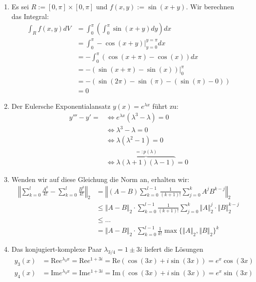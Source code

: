 \documentclass{article}
\begin{document}
\begin{enumerate}
\item Es sei $R := \left[0, \pi\right] \times \left[0, \pi\right]$ und $f(x, y)
  := \sin (x + y)$.  Wir berechnen das Integral:
  \begin{align*}
    \int_{R} f(x, y) dV
    &= \int_{0}^{\pi}\left(\int_{0}^{\pi}\sin(x+y) dy \right) dx \\
    &= \int_{0}^{\pi} - \cos (x+y)\bigg\vert_{y=0}^{y=\pi} dx \\
    &= - \int_{0}^{\pi}(\cos (x+\pi) - \cos(x)) dx \\
    &= -(\sin (x+\pi) - \sin(x)) \bigg\vert_{0}^{\pi} \\
    &= -(\sin(2\pi) - \sin(\pi) -(\sin (\pi) - 0)) \\
    &= 0
  \end{align*}
\item Der Eulersche Exponentialansatz $y(x) = e^{\lambda x}$ führt zu:
  \begin{align*}
    y''' - y' =
    &\Leftrightarrow e^{\lambda x}(\lambda^{3} - \lambda) = 0 \\
    &\Leftrightarrow \lambda^{3} - \lambda = 0 \\
    &\Leftrightarrow \lambda(\lambda^{2} - 1) = 0 \\
    &\Leftrightarrow \overbrace{\lambda(\lambda+1)(\lambda-1)}^{=: p(\lambda)} = 0
  \end{align*}
\item Wenden wir auf diese Gleichung die Norm an, erhalten wir:
  \begin{align*}
    \left\Vert \sum_{k=0}^{l}\frac{A^{k}}{k!} - \sum_{k=0}^{l}\frac{B^{k}}{k!}
    \right\Vert_{2}
    &= \left\Vert (A - B)
      \sum_{k=0}^{l-1}\frac{1}{(k+1)!}\sum_{j=0}^{k}A^{j}B^{k-j}\right\Vert_{2}
    \\
    &\le \left\Vert A - B \right\Vert_{2} \cdot \sum_{k=0}^{l-1} \frac{1}{(k+1)!}
    \sum_{j=0}^{k}\left\Vert A \right\Vert_{2}^{j} \cdot \left\Vert B \right\Vert_{2}^{k-j}
    \\
    &\le \ldots \\
    &= \left\Vert A - B \right\Vert_{2} \cdot \sum_{k=0}^{l-1}\frac{1}{k!}
      \max\{\left\Vert A \right\Vert_{2}, \left\Vert B \right\Vert_{2}\}^{k}
  \end{align*}
\item Das konjugiert-komplexe Paar $\lambda_{3/4} = 1 \pm 3i$ liefert die
  Lösungen
  \begin{align*}
    y_{3}(x) &= \mathrm{Re}e^{\lambda_{3}x} = \mathrm{Re}e^{1+3i} =
               \mathrm{Re}(\cos(3x) + i \sin(3x))  = e^{x} \cos(3x) \\
    y_{4}(x) &= \mathrm{Im}e^{\lambda_{3}x} = \mathrm{Im}e^{1+3i} =
               \mathrm{Im}(\cos(3x) + i \sin(3x))  = e^{x} \sin(3x) \\
  \end{align*}
\end{enumerate}
\end{document}
